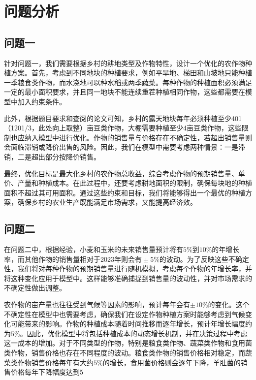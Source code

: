\chapter[\hspace{0pt}问题分析]{{\heiti{}\hspace{0pt}问题分析}}\label{chapter1: 问题分析}
\removelofgap
\removelotgap

\section[\hspace{-2pt}问题一]{{\heiti{} \hspace{-8pt}问题一}}\label{section1: 问题一}

针对问题一，我们需要根据乡村的耕地类型及作物特性，设计一个优化的农作物种植方案。首先，考虑到不同地块的种植要求，例如平旱地、梯田和山坡地只能种植一季粮食类作物，而水浇地可以种水稻或两季蔬菜。每种作物的种植面积必须满足一定的最小面积要求，并且同一地块不能连续重茬种植相同作物，这些都需要在模型中加入约束条件。

此外，根据题目要求和查阅的论文可知，乡村的露天地块每年必须种植至少401（1201/3，此处向上取整）亩豆类作物，大棚需要种植至少4亩豆类作物，这些限制也应纳入模型中进行优化。作物的销售量与价格存在不确定性，若超出销售量则会面临滞销或降价出售的风险。因此，我们在模型中需要考虑两种情景：一是滞销，二是超出部分按降价销售。

最终，优化目标是最大化乡村的农作物总收益，综合考虑作物的预期销售量、单价、产量和种植成本。在此过程中，还要考虑耕地面积的限制，确保每块地的种植面积不超过其可用面积。通过这些约束和目标，我们将能够得出一个最优的种植方案，确保乡村的农业生产既能满足市场需求，又能提高经济效。

\section[\hspace{-2pt}问题二]{{\heiti{} \hspace{-8pt}问题二}}\label{section1: 问题二}

在问题二中，根据经验，小麦和玉米的未来销售量预计将有$5\%$到$10\%$的年增长率，而其他作物的销售量相对于2023年则会$有±5\%$的波动。为了反映这些不确定性，我们将对每种作物的预期销售量进行随机模拟，考虑每个作物的年增长率，并将这种变化应用于模型中。这样能够准确捕捉到销售量的波动性，并对市场需求的不确定性做出调整。

农作物的亩产量也往往受到气候等因素的影响，预计每年会有$±10\%$的变化。这个不确定性在模型中也需要考虑，确保我们在设定作物种植方案时能够考虑到气候变化可能带来的影响。作物的种植成本随着时间推移而逐年增长，预计年增长幅度约为$5\%$。因此，优化模型中将包括种植成本的动态增长机制，并在决策过程中考虑这一成本的增加。对于不同类型的作物，特别是粮食类作物、蔬菜类作物和食用菌类作物，销售价格也存在不同程度的波动。粮食类作物的销售价格相对稳定，而蔬菜类作物销售价格每年有大约$5\%$的增长，食用菌价格则会逐年下降，羊肚菌的销售价格每年下降幅度达到5%

